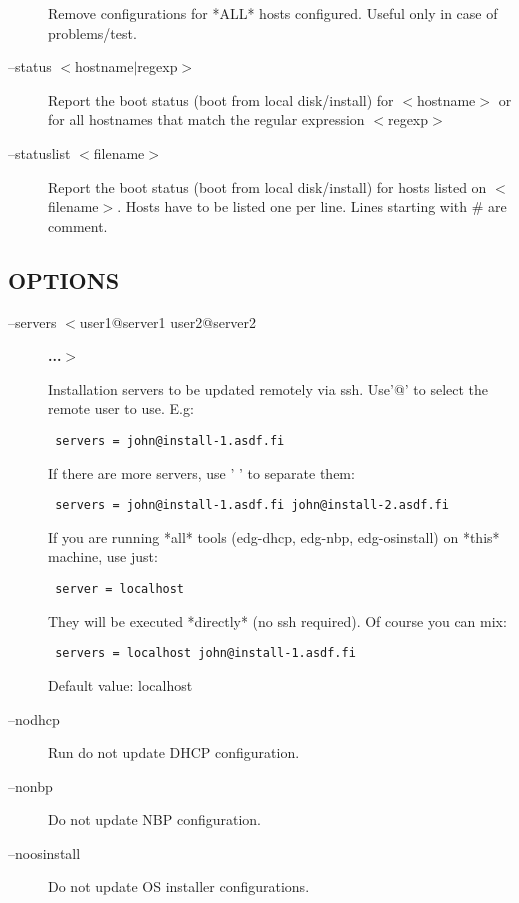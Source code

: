\begin{description}
Remove configurations for *ALL* hosts configured. Useful only in case
of problems/test.


\item[--status $<$hostname$|$regexp$>$] \mbox{}

Report the boot status (boot from local disk/install) for $<$hostname$>$ or
for all hostnames that match the regular expression $<$regexp$>$


\item[--statuslist $<$filename$>$] \mbox{}

Report the boot status (boot from local disk/install) for hosts listed
on $<$filename$>$. Hosts have to be listed one per line. Lines starting
with \# are comment.

\end{description}
\subsection*{OPTIONS\label{edg-installfe_OPTIONS}}
\begin{description}

\item[--servers $<$user1@server1 user2@server2] \textbf{...$>$}

Installation servers to be updated remotely via ssh. Use'@'
to select the remote user to use. E.g:

\begin{verbatim}
 servers = john@install-1.asdf.fi
\end{verbatim}


If there are more servers, use ' ' to separate them:

\begin{verbatim}
 servers = john@install-1.asdf.fi john@install-2.asdf.fi
\end{verbatim}


If you are running *all* tools (edg-dhcp, edg-nbp, edg-osinstall)
on *this* machine, use just:

\begin{verbatim}
 server = localhost
\end{verbatim}


They will be executed *directly* (no ssh required). Of course you can mix:

\begin{verbatim}
 servers = localhost john@install-1.asdf.fi
\end{verbatim}


Default value: localhost


\item[--nodhcp] \mbox{}

Run do not update DHCP configuration.


\item[--nonbp] \mbox{}

Do not update NBP configuration.


\item[--noosinstall] \mbox{}

Do not update OS installer configurations.

\end{description}
